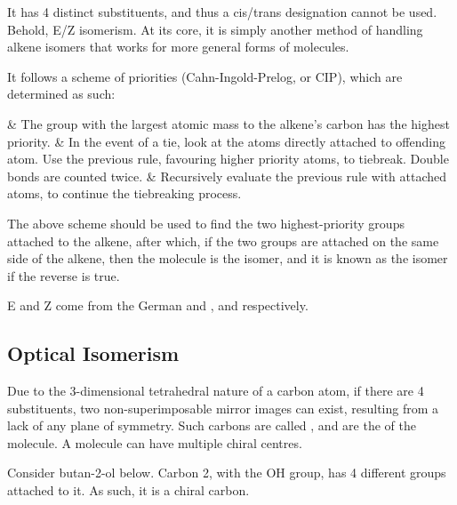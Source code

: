 
			It has 4 distinct substituents, and thus a cis/trans designation cannot be used. Behold, E/Z isomerism. At its core, it
			is simply another method of handling alkene isomers that works for more general forms of molecules.

			It follows a scheme of priorities (Cahn-Ingold-Prelog, or CIP), which are determined as such:
			\begin{romanlist}
				& The group with the largest atomic mass  to the alkene's carbon has the highest priority.
				& In the event of a tie, look at the atoms directly attached to  offending atom. Use the previous
				  rule, favouring higher priority atoms, to tiebreak. Double bonds are counted twice.
				& Recursively evaluate the previous rule with attached atoms, to continue the tiebreaking process.
			\end{romanlist}

			The above scheme should be used to find the two highest-priority groups attached to the alkene, after which, if the two
			groups are attached on the same side of the alkene, then the molecule is the  isomer, and it is known as the
			 isomer if the reverse is true.

			E and Z come from the German  and ,  and 
			respectively.



		\pagebreak
		\subsection{Optical Isomerism}

			Due to the 3-dimensional tetrahedral nature of a carbon atom, if there are 4  substituents, two
			non-superimposable mirror images can exist, resulting from a lack of any plane of symmetry. Such carbons are called
			, and are the  of the molecule. A molecule can have multiple chiral
			centres.

			Consider butan-2-ol below. Carbon 2, with the OH group, has 4 different groups attached to it. As such, it is a chiral carbon.


